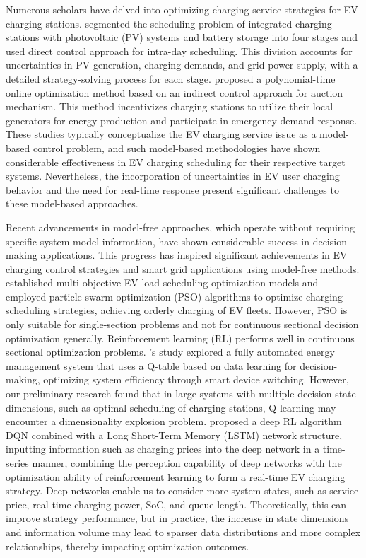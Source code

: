 \documentclass[preprint,12pt]{elsarticle}
\begin{document}
Numerous scholars have delved into optimizing charging service strategies
for EV charging stations. \citet{yan_optimized_2019}
segmented the scheduling problem of integrated charging stations with
photovoltaic (PV) systems and battery storage into four stages and
used direct control approach for intra-day scheduling. This division
accounts for uncertainties in PV generation, charging demands, and
grid power supply, with a detailed strategy-solving process for each
stage. \citet{yuan_scheduling_2022} proposed a
polynomial-time online optimization method based on an indirect control
approach for auction mechanism. This method incentivizes charging
stations to utilize their local generators for energy production and
participate in emergency demand response. These studies typically
conceptualize the EV charging service issue as a model-based control
problem, and such model-based methodologies have shown considerable
effectiveness in EV charging scheduling for their respective target
systems. Nevertheless, the incorporation of uncertainties in EV user
charging behavior and the need for real-time response present significant
challenges to these model-based approaches.

Recent advancements in model-free approaches, which operate without
requiring specific system model information, have shown considerable
success in decision-making applications. This progress has inspired
significant achievements in EV charging control strategies and smart
grid applications using model-free methods. \citet{di_research_2022,zhang_optimization_2022}
established multi-objective EV load scheduling optimization models
and employed particle swarm optimization (PSO) algorithms to optimize
charging scheduling strategies, achieving orderly charging of EV fleets.
However, PSO is only suitable for single-section problems and not
for continuous sectional decision optimization generally. Reinforcement
learning (RL) performs well in continuous sectional optimization problems.
\citet{2015Optimal}'s study explored a fully automated
energy management system that uses a Q-table based on data learning
for decision-making, optimizing system efficiency through smart device
switching. However, our preliminary research \citep{tang_access_2022}
found that in large systems with multiple decision state dimensions,
such as optimal scheduling of charging stations, Q-learning may encounter
a dimensionality explosion problem. \citet{wan_model-free_2019}
proposed a deep RL algorithm DQN combined with a Long Short-Term Memory
(LSTM) network structure, inputting information such as charging prices
into the deep network in a time-series manner, combining the perception
capability of deep networks with the optimization ability of reinforcement
learning to form a real-time EV charging strategy. Deep networks enable
us to consider more system states, such as service price, real-time
charging power, SoC, and queue length. Theoretically, this can improve
strategy performance, but in practice, the increase in state dimensions
and information volume may lead to sparser data distributions and
more complex relationships, thereby impacting optimization outcomes.\citep{DBLP:journals/joeuc/Yu22}
\end{document}
